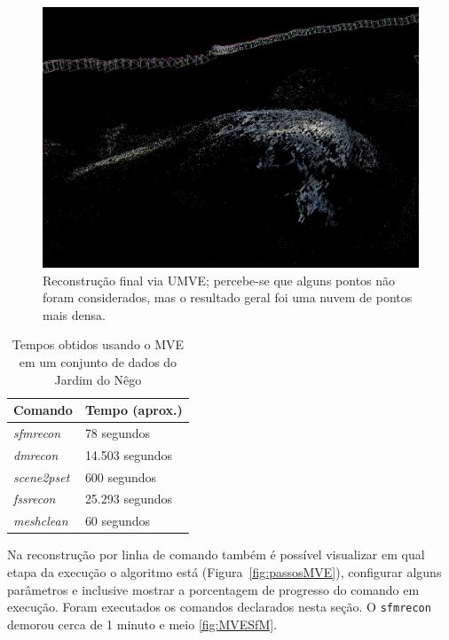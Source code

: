 \begin{figure}[!h]
	\centering
	\includegraphics[width=\linewidth]{figs/umvedense.png}
	\caption{%
  Reconstrução final via UMVE; percebe-se que alguns pontos não foram
  considerados, mas o resultado geral foi uma nuvem de pontos mais densa.
	}\label{fig:UMVEdense}
\end{figure} 

\begin{table}[!h]
\centering
\caption{Tempos obtidos usando o MVE em um conjunto de dados do Jardim do Nêgo}
\label{tab:mveSapo}
\begin{tabular}{|l|l|}
\hline
Comando            & Tempo (aprox.)    \\ \hline
\emph{sfmrecon}  & 78 segundos     \\ \hline
\emph{dmrecon}   & 14.503 segundos \\ \hline
\emph{scene2pset} & 600 segundos    \\ \hline
\emph{fssrecon}  & 25.293 segundos \\ \hline
\emph{meshclean} & 60 segundos     \\ \hline
\end{tabular}
\end{table}

Na reconstrução por linha de comando também é possível visualizar em qual etapa
da execução o algoritmo está (Figura~\ref{fig:passosMVE}), configurar alguns
parâmetros e inclusive mostrar a porcentagem de progresso do comando em
execução. Foram executados os comandos declarados nesta seção.  O
\texttt{sfmrecon} demorou cerca de 1 minuto e meio \ref{fig:MVESfM}. 

